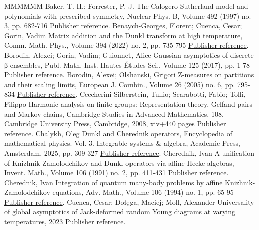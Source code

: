 \begin{thebibliography}{MMMMMM}
 Baker, T. H.; Forrester, P. J. The Calogero-Sutherland model and polynomials with prescribed symmetry, Nuclear Phys. B, Volume 492 (1997) no. 3, pp. 682-716 \href{https://alco.centre-mersenne.org/articles/10.5802/alco.451/#baker1997calogero}{Publisher reference}.
 Benaych-Georges, Florent; Cuenca, Cesar; Gorin, Vadim Matrix addition and the Dunkl transform at high temperature, Comm. Math. Phys., Volume 394 (2022) no. 2, pp. 735-795 \href{https://alco.centre-mersenne.org/articles/10.5802/alco.451/#benaych2022matrix}{Publisher reference}.
 Borodin, Alexei; Gorin, Vadim; Guionnet, Alice Gaussian asymptotics of discrete β-ensembles, Publ. Math. Inst. Hautes Études Sci., Volume 125 (2017), pp. 1-78 \href{https://alco.centre-mersenne.org/articles/10.5802/alco.451/#borodin2017gaussian}{Publisher reference}.
 Borodin, Alexei; Olshanski, Grigori Z-measures on partitions and their scaling limits, European J. Combin., Volume 26 (2005) no. 6, pp. 795-834 \href{https://alco.centre-mersenne.org/articles/10.5802/alco.451/#borodin2005z}{Publisher reference}.
 Ceccherini-Silberstein, Tullio; Scarabotti, Fabio; Tolli, Filippo Harmonic analysis on finite groups: Representation theory, Gelfand pairs and Markov chains, Cambridge Studies in Advanced Mathematics, 108, Cambridge University Press, Cambridge, 2008, xiv+440 pages \href{https://alco.centre-mersenne.org/articles/10.5802/alco.451/#ceccherini2008harmonic}{Publisher reference}.
 Chalykh, Oleg Dunkl and Cherednik operators, Encyclopedia of mathematical physics. Vol. 3. Integrable systems \& algebra, Academic Press, Amsterdam, 2025, pp. 309-327 \href{https://alco.centre-mersenne.org/articles/10.5802/alco.451/#chalykh2024dunkl}{Publisher reference}.
 Cherednik, Ivan A unification of Knizhnik-Zamolodchikov and Dunkl operators via affine Hecke algebras, Invent. Math., Volume 106 (1991) no. 2, pp. 411-431 \href{https://alco.centre-mersenne.org/articles/10.5802/alco.451/#cherednik1991unification}{Publisher reference}.
 Cherednik, Ivan Integration of quantum many-body problems by affine Knizhnik-Zamolodchikov equations, Adv. Math., Volume 106 (1994) no. 1, pp. 65-95 \href{https://alco.centre-mersenne.org/articles/10.5802/alco.451/#cherednik1994integration}{Publisher reference}.
 Cuenca, Cesar; Dołęga, Maciej; Moll, Alexander Universality of global asymptotics of Jack-deformed random Young diagrams at varying temperatures, 2023 \href{https://alco.centre-mersenne.org/articles/10.5802/alco.451/#cuenca2023universality}{Publisher reference}.

\end{thebibliography}

